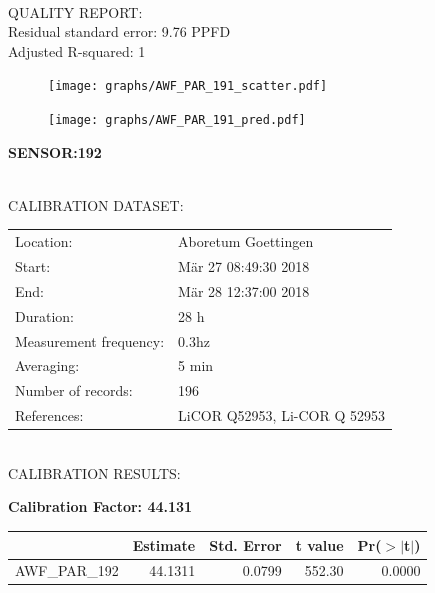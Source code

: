 \documentclass[oneside]{report}
\begin{document}
\hrulefill\\
QUALITY REPORT:\\
Residual standard error: 9.76 PPFD\\
Adjusted R-squared: 1



\begin{figure}[H]
  \centering
  \texttt{[image: graphs/AWF\_PAR\_191\_scatter.pdf]}
\end{figure}




\begin{figure}[H]
  \centering
  \texttt{[image: graphs/AWF\_PAR\_191\_pred.pdf]}
\end{figure}

\pagebreak


\begin{center}
\large{\textbf{SENSOR:192}}\\
\end{center}

\hrulefill\\
CALIBRATION DATASET:\\
\begin{table}[h!]
  \centering
  \label{tab:table1}
  \begin{tabular}{ll}
    Location: & Aboretum Goettingen\\ 
    
    
    Start:  & Mär 27 08:49:30 2018 \\
    End:   & Mär 28 12:37:00 2018\\ 
    Duration: & 28 h\\
    Measurement frequency: & 0.3hz\\
    Averaging:  &5 min\\
    Number of records: & 196 \\
    References: & LiCOR Q52953, Li-COR Q 52953 \\
  \end{tabular}
\end{table}

\hrulefill\\
CALIBRATION RESULTS:\\


\begin{center}
\textbf{\large{Calibration Factor: 44.131}}\\
\end{center}
\begin{table}[ht]
\centering
\begin{tabular}{rrrrr}
  \hline
 & Estimate & Std. Error & t value & Pr($>$$|$t$|$) \\ 
  \hline
AWF\_PAR\_192 & 44.1311 & 0.0799 & 552.30 & 0.0000 \\ 
   \hline
\end{tabular}
\end{table}
\end{document}
